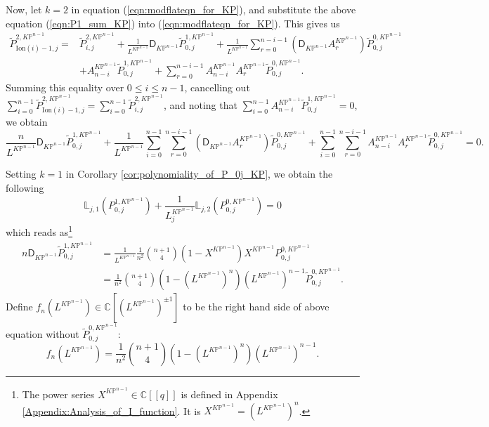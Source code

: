 \documentclass[12pt]{amsart}
\numberwithin{equation}{section}
\newcommand{\KP}{K\mathbb{P}}
\begin{document}
Now, let $k=2$ in equation (\ref{eqn:modflateqn_for_KP}), and substitute the above equation (\ref{eqn:P1_sum_KP}) into (\ref{eqn:modflateqn_for_KP}). This gives us 
\begin{equation*}
\begin{split}
\widetilde{P}_{\mathrm{Ion}(i)-1,j}^{2,\KP^{n-1}}
=&\widetilde{P}_{i,j}^{2,\KP^{n-1}}+\frac{1}{L^{\KP^{n-1}}}\mathsf{D}_{\KP^{n-1}}\widetilde{P}_{0 ,j}^{1,\KP^{n-1}}+\frac{1}{L^{\KP^{n-1}}}\sum_{r=0}^{n-i-1} \left(\mathsf{D}_{\KP^{n-1}}A^{\KP^{n-1}}_{r}\right) \widetilde{P}_{0, j}^{0,\KP^{n-1}}\\
&+A^{\KP^{n-1}}_{n-i}\widetilde{P}_{0, j}^{1,\KP^{n-1}}+\sum_{r=0}^{n-i-1}A^{\KP^{n-1}}_{n-i}A^{\KP^{n-1}}_{r} \widetilde{P}_{0, j}^{0,\KP^{n-1}}.
\end{split}
\end{equation*}
Summing this equality over $0\leq{i}\leq{n-1}$, cancelling out $\sum_{i=0}^{n-1}\widetilde{P}_{\mathrm{Ion}(i)-1,j}^{2,\KP^{n-1}}=\sum_{i=0}^{n-1}\widetilde{P}_{i,j}^{2,\KP^{n-1}}$, and noting that $\sum_{i=0}^{n-1}A^{\KP^{n-1}}_{n-i}\widetilde{P}_{0,j}^{1,\KP^{n-1}}=0$, we obtain
\begin{equation}\label{eq:nLDP1}
\frac{n}{L^{\KP^{n-1}}}\mathsf{D}_{\KP^{n-1}}\widetilde{P}_{0,j}^{1,\KP^{n-1}}+\frac{1}{L^{\KP^{n-1}}}\sum_{i=0}^{n-1}\sum_{r=0}^{n-i-1}\left(\mathsf{D}_{\KP^{n-1}}A^{\KP^{n-1}}_r\right)\widetilde{P}_{0,j}^{0,\KP^{n-1}}+\sum_{i=0}^{n-1}\sum_{r=0}^{n-i-1}A^{\KP^{n-1}}_{n-i}A^{\KP^{n-1}}_r\widetilde{P}_{0,j}^{0,\KP^{n-1}}=0.
\end{equation}

Setting $k=1$ in Corollary \ref{cor:polynomiality_of_P_0j_KP}, we obtain the following 
\begin{equation*}
\mathds{L}_{j,1}(P^{1,\KP^{n-1}}_{0,j})+\frac{1}{L^{\KP^{n-1}}_j}\mathds{L}_{j,2}(P^{0,\KP^{n-1}}_{0,j})=0
\end{equation*}
which reads as\footnote{The power series $X^{\KP^{n-1}}\in\mathbb{C}[\![q]\!]$ is defined in Appendix \ref{Appendix:Analysis_of_I_function}. It is $X^{\KP^{n-1}}=(L^{\KP^{n-1}})^n$.}
\begin{align*}
n\mathsf{D}_{\KP^{n-1}}\widetilde{P}^{1,\KP^{n-1}}_{0,j}
&=\frac{1}{L^{\KP^{n-1}}}\frac{1}{n^2}\binom{n+1}{4}(1-X^{\KP^{n-1}})X^{\KP^{n-1}}P^{0,\KP^{n-1}}_{0,j}\\
&=\frac{1}{n^2}\binom{n+1}{4}(1-(L^{\KP^{n-1}})^n)(L^{\KP^{n-1}})^{n-1}\widetilde{P}^{0,\KP^{n-1}}_{0,j}.
\end{align*}
Define $f_n(L^{\KP^{n-1}})\in\mathbb{C}[(L^{\KP^{n-1}})^{\pm{1}}]$ to be the right hand side of above equation without $\widetilde{P}^{0,\KP^{n-1}}_{0,j}$:
\begin{equation*}
f_n(L^{\KP^{n-1}})=\frac{1}{n^2}\binom{n+1}{4}(1-(L^{\KP^{n-1}})^n)(L^{\KP^{n-1}})^{n-1}.
\end{equation*}
\end{document}
